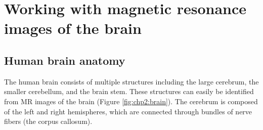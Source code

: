 \chapter{Working with magnetic resonance images of the brain}
\label{chp:chp2}

\section{Human brain anatomy}
\label{sec:chp2:anatomy}

The human brain consists of multiple structures including the large
cerebrum, the smaller cerebellum, and the brain stem. These structures
can easily be identified from MR images of the brain (Figure
\ref{fig:chp2:brain}). The cerebrum is composed of the left and right
hemispheres, which are connected through bundles of nerve fibers (the
corpus callosum).


